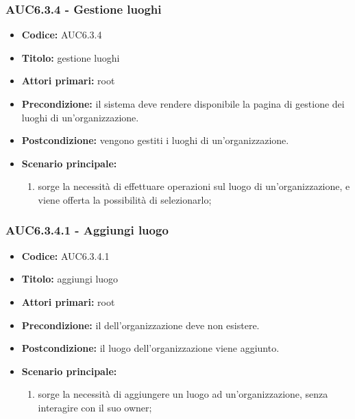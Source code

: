 \documentclass[casi-duso]{subfiles}
\begin{document}
\subsubsection{AUC6.3.4 - Gestione luoghi}%
\label{subsub:AUC6.3.4}
\begin{itemize}
  \item \textbf{Codice:} AUC6.3.4
  \item \textbf{Titolo:} gestione luoghi
  \item \textbf{Attori primari:} root
  \item \textbf{Precondizione:} il sistema deve rendere disponibile la pagina di gestione dei luoghi di un'organizzazione.
  \item \textbf{Postcondizione:} vengono gestiti i luoghi di un'organizzazione.
  \item \textbf{Scenario principale:}
  \begin{enumerate}
    \item sorge la necessità di effettuare operazioni sul luogo di un'organizzazione, e viene offerta la possibilità di selezionarlo;
  \end{enumerate}
\end{itemize}

\subsubsection{AUC6.3.4.1 - Aggiungi luogo}%
\label{subsub:AUC6.3.4.1}
\begin{itemize}
  \item \textbf{Codice:} AUC6.3.4.1
  \item \textbf{Titolo:} aggiungi luogo
  \item \textbf{Attori primari:} root
  \item \textbf{Precondizione:} il  dell'organizzazione deve non esistere.
  \item \textbf{Postcondizione:} il luogo dell'organizzazione viene aggiunto.
  \item \textbf{Scenario principale:}
  \begin{enumerate}
    \item sorge la necessità di aggiungere un luogo ad un'organizzazione, senza interagire con il suo owner;
  \end{enumerate}
\end{itemize}
\end{document}
